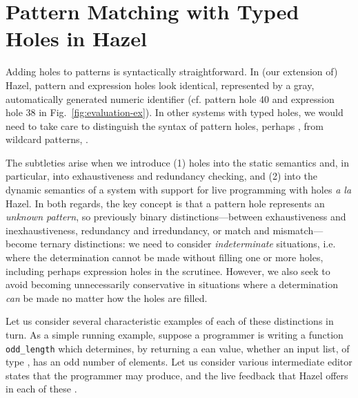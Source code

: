 \section{Pattern Matching with Typed Holes in Hazel}\label{sec:examples}
Adding holes to patterns is syntactically straightforward. In (our extension of) Hazel, pattern and expression holes look identical, represented by a gray, automatically generated numeric identifier (cf. pattern hole 40 and expression hole 38 in Fig.~\ref{fig:evaluation-ex}). In other systems with typed holes, we would need to take care to distinguish the syntax of pattern holes, perhaps , from wildcard patterns, \li{_}.

The subtleties arise when we introduce  (1) holes into the static semantics and, in particular, into exhaustiveness and redundancy checking, and (2) into the dynamic semantics of a system with support for live programming with holes \emph{a la} Hazel. In both regards, the key concept is that a pattern hole represents an \emph{unknown  pattern}, so previously binary distinctions---between exhaustiveness and inexhaustiveness, redundancy and irredundancy, or match and mismatch---become ternary distinctions: we need to consider \emph{indeterminate} situations, i.e. where the determination cannot be made without filling one or more holes, including perhaps expression holes in the scrutinee. However, we also seek to avoid becoming unnecessarily conservative in situations where a determination \emph{can} be made no matter how the holes are filled.

Let us consider several characteristic examples of each of these distinctions in turn. As a simple running example, suppose a programmer is writing a function \texttt{odd\_length} which determines, by returning a ean value, whether an input list, of type \li{[Int]}, has an odd number of elements. Let us consider
various intermediate editor states that the programmer may produce, and the live feedback that Hazel offers in each of these \cite{Potter2020HazelTG}.

